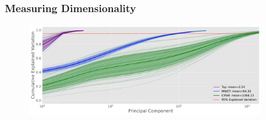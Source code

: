 \begin{frame}
  \frametitle{Measuring Dimensionality}
\begin{figure}[t]
    \centering
    \includegraphics[width=0.9\textwidth]{c4a_figures/dimensionality_chords.pdf}
\end{figure}
\end{frame} 


